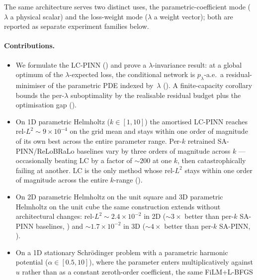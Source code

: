 \noindent The same architecture serves two distinct uses, the
parametric-coefficient mode ($\lambda$ a physical scalar) and the
loss-weight mode ($\lambda$ a weight vector); both are reported as
separate experiment families below.

\paragraph{Contributions.}
\begin{itemize}\setlength{\itemsep}{0pt}
   \item We formulate the LC-PINN
         () and prove a
         $\lambda$-invariance result: at a global optimum of the
         $\lambda$-expected loss, the conditional network is
         $p_\lambda$-a.e.\ a residual-minimiser of the parametric
         PDE indexed by~$\lambda$ (). A
         finite-capacity corollary bounds the per-$\lambda$
         suboptimality by the realisable residual budget plus the
         optimisation gap ().
   \item On 1D parametric Helmholtz ($k \!\in\! [1, 10]$) the
         amortised LC-PINN reaches rel-$L^2 \!\sim\! 9\!\times\!10^{-4}$
         on the grid mean and stays within one order of magnitude of
         its own best across the entire parameter range. Per-$k$
         retrained SA-PINN/ReLoBRaLo baselines vary by three orders of
         magnitude across $k$ --- occasionally beating LC by a factor
         of $\sim\!200$ at one $k$, then catastrophically failing at
         another. LC is the only method whose rel-$L^2$ stays within
         one order of magnitude across the entire $k$-range
         ().
   \item On 2D parametric Helmholtz on the unit square and 3D
         parametric Helmholtz on the unit cube the same construction
         extends without architectural changes: rel-$L^2 \!\sim\!
         2.4\!\times\!10^{-2}$ in 2D ($\sim\!3\times$ better than
         per-$k$ SA-PINN baselines, )
         and $\sim\!1.7\!\times\!10^{-2}$ in 3D ($\sim\!4\times$
         better than per-$k$ SA-PINN, ).
   \item On a 1D stationary Schrödinger problem with a parametric
         harmonic potential ($\alpha \!\in\! [0.5, 10]$), where the
         parameter enters multiplicatively against $u$ rather than as
         a constant zeroth-order coefficient, the same FiLM+L-BFGS

\end{itemize}
